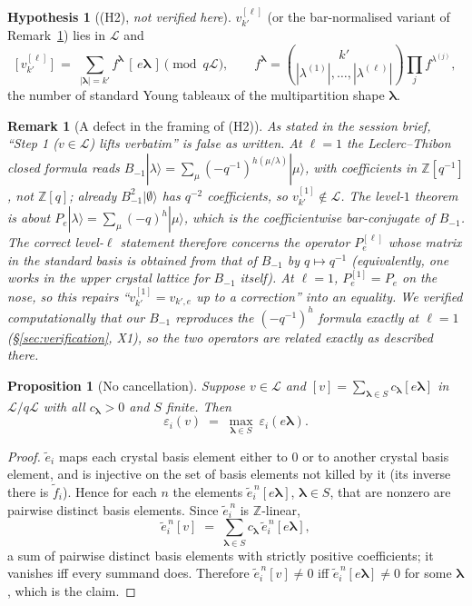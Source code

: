 \documentclass[11pt]{article}
\newtheorem{proposition}[theorem]{Proposition}
\newtheorem{remark}[theorem]{Remark}
\theoremstyle{definition}
\newtheorem{hypothesis}[theorem]{Hypothesis}
\newcommand{\ZZ}{\mathbb{Z}}
\newcommand{\Lcr}{\mathcal{L}}
\newcommand{\ee}{\tilde e}
\newcommand{\ff}{\tilde f}
\newcommand{\eps}{\varepsilon}
\newcommand{\blam}{\boldsymbol{\lambda}}
\newcommand{\Bmi}{B_{-1}}
\begin{document}
\begin{hypothesis}[(H2), \emph{not verified here}]\label{hyp:H2}
$v^{[\ell]}_{k'}$ (or the bar-normalised variant of
Remark~\ref{rmk:lattice}) lies in $\Lcr$ and
\[
  \bigl[\,v^{[\ell]}_{k'}\,\bigr] \;=\;
  \sum_{|\blam| = k'} f^{\blam}\,[\,e\blam\,] \pmod{q\Lcr},
  \qquad
  f^{\blam} = \binom{k'}{|\lambda^{(1)}|,\dots,|\lambda^{(\ell)}|}\prod_j f^{\lambda^{(j)}} ,
\]
the number of standard Young tableaux of the multipartition shape $\blam$.
\end{hypothesis}

\begin{remark}[A defect in the framing of (H2)]\label{rmk:lattice}
As stated in the session brief, ``Step 1 ($v \in \Lcr$) lifts verbatim''
is \emph{false as written}. At $\ell = 1$ the Leclerc--Thibon closed
formula reads $\Bmi|\lambda\rangle = \sum_\mu (-q^{-1})^{h(\mu/\lambda)}|\mu\rangle$,
with coefficients in $\ZZ[q^{-1}]$, not $\ZZ[q]$; already
$\Bmi^2|\emptyset\rangle$ has $q^{-2}$ coefficients, so
$v^{[1]}_{k'} \notin \Lcr$. The level-$1$ theorem is about
$P_e|\lambda\rangle = \sum_\mu (-q)^{h}|\mu\rangle$, which is the
coefficientwise bar-conjugate of $\Bmi$. The correct level-$\ell$
statement therefore concerns the operator $P^{[\ell]}_e$ whose matrix in
the standard basis is obtained from that of $\Bmi$ by $q \mapsto q^{-1}$
(equivalently, one works in the \emph{upper} crystal lattice for $\Bmi$
itself). At $\ell = 1$, $P^{[1]}_e = P_e$ on the nose, so this repairs
``$v^{[1]}_{k'} = v_{k',e}$ up to a correction'' into an equality. We
verified computationally that our $\Bmi$ reproduces the
$(-q^{-1})^{h}$ formula exactly at $\ell = 1$
(\S\ref{sec:verification}, X1), so the two operators are related exactly
as described there.
\end{remark}

\begin{proposition}[No cancellation]\label{prop:nocancel}
Suppose $v \in \Lcr$ and $[v] = \sum_{\blam \in S} c_{\blam}[e\blam]$ in
$\Lcr/q\Lcr$ with all $c_{\blam} > 0$ and $S$ finite. Then
\[
  \eps_i(v) \;=\; \max_{\blam \in S}\ \eps_i(e\blam).
\]
\end{proposition}

\begin{proof}
$\ee_i$ maps each crystal basis element either to $0$ or to another
crystal basis element, and is injective on the set of basis elements not
killed by it (its inverse there is $\ff_i$). Hence for each $n$ the
elements $\ee_i^{\,n}[e\blam]$, $\blam \in S$, that are nonzero are
pairwise distinct basis elements. Since $\ee_i^{\,n}$ is $\ZZ$-linear,
\[
  \ee_i^{\,n}[v] \;=\; \sum_{\blam \in S} c_{\blam}\, \ee_i^{\,n}[e\blam],
\]
a sum of pairwise distinct basis elements with strictly positive
coefficients; it vanishes iff every summand does. Therefore
$\ee_i^{\,n}[v] \ne 0$ iff $\ee_i^{\,n}[e\blam] \ne 0$ for some $\blam$,
which is the claim.
\end{proof}
\end{document}
